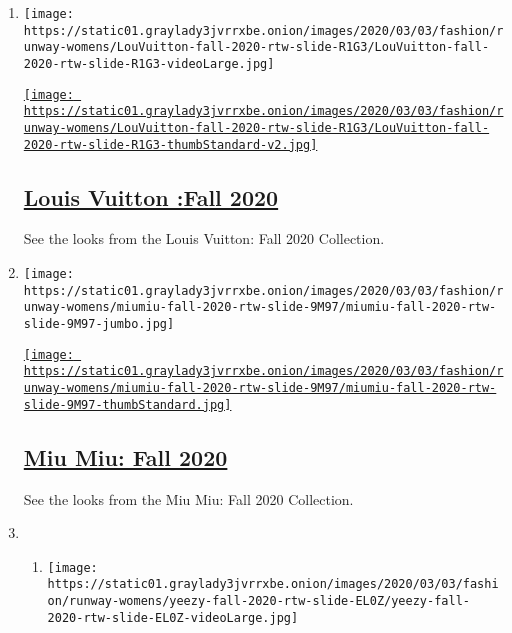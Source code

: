 \begin{enumerate}
\def\labelenumi{\arabic{enumi}.}
\item
  \texttt{[image: https://static01.graylady3jvrrxbe.onion/images/2020/03/03/fashion/runway-womens/LouVuitton-fall-2020-rtw-slide-R1G3/LouVuitton-fall-2020-rtw-slide-R1G3-videoLarge.jpg]}

  \href{/slideshow/2020/03/03/fashion/runway-womens/louis-vuitton-fall-2020.html}{\texttt{[image: https://static01.graylady3jvrrxbe.onion/images/2020/03/03/fashion/runway-womens/LouVuitton-fall-2020-rtw-slide-R1G3/LouVuitton-fall-2020-rtw-slide-R1G3-thumbStandard-v2.jpg]}}

  \hypertarget{louis-vuitton-fall-2020}{%
  \subsection{\texorpdfstring{\href{/slideshow/2020/03/03/fashion/runway-womens/louis-vuitton-fall-2020.html}{Louis
  Vuitton :Fall
  2020}}{Louis Vuitton :Fall 2020}}\label{louis-vuitton-fall-2020}}

  See the looks from the Louis Vuitton: Fall 2020 Collection.
\item
  \texttt{[image: https://static01.graylady3jvrrxbe.onion/images/2020/03/03/fashion/runway-womens/miumiu-fall-2020-rtw-slide-9M97/miumiu-fall-2020-rtw-slide-9M97-jumbo.jpg]}

  \href{/slideshow/2020/03/03/fashion/runway-womens/miu-miu-fall-2020.html}{\texttt{[image: https://static01.graylady3jvrrxbe.onion/images/2020/03/03/fashion/runway-womens/miumiu-fall-2020-rtw-slide-9M97/miumiu-fall-2020-rtw-slide-9M97-thumbStandard.jpg]}}

  \hypertarget{miu-miu-fall-2020}{%
  \subsection{\texorpdfstring{\href{/slideshow/2020/03/03/fashion/runway-womens/miu-miu-fall-2020.html}{Miu
  Miu: Fall 2020}}{Miu Miu: Fall 2020}}\label{miu-miu-fall-2020}}

  See the looks from the Miu Miu: Fall 2020 Collection.
\item
  \begin{enumerate}
  \def\labelenumii{\arabic{enumii}.}
  \item
    \texttt{[image: https://static01.graylady3jvrrxbe.onion/images/2020/03/03/fashion/runway-womens/yeezy-fall-2020-rtw-slide-EL0Z/yeezy-fall-2020-rtw-slide-EL0Z-videoLarge.jpg]}


\end{enumerate}
\end{enumerate}

